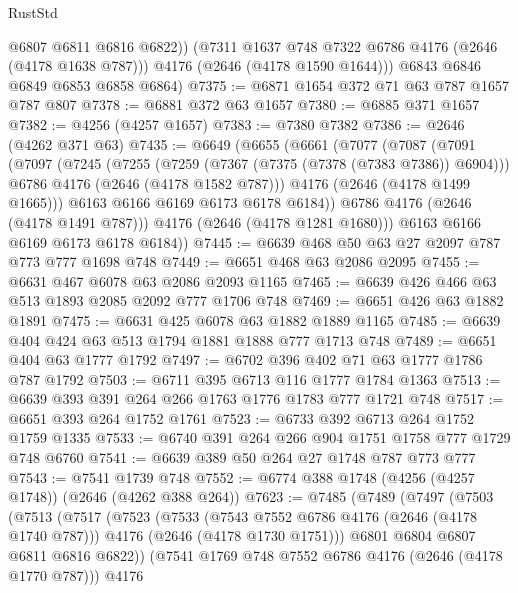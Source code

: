 \begin{lexlean}{RustStd}
\begin{coremodule}
            @6807
            @6811
            @6816
            @6822))
        (@7311 @1637 @748 @7322 @6786 @4176 (@2646 (@4178 @1638 @787)))
        @4176
        (@2646 (@4178 @1590 @1644)))
      @6843
      @6846
      @6849
      @6853
      @6858
      @6864)
@7375 := @6871 @1654 @372 @71 @63 @787 @1657 @787 @807
@7378 := @6881 @372 @63 @1657
@7380 := @6885 @371 @1657
@7382 := @4256 (@4257 @1657)
@7383 := @7380 @7382
@7386 := @2646 (@4262 @371 @63)
@7435 := @6649
    (@6655
      (@6661
        (@7077
          (@7087
            (@7091
              (@7097
                (@7245
                  (@7255
                    (@7259 (@7367 (@7375 (@7378 (@7383 @7386)) @6904)))
                    @6786
                    @4176
                    (@2646 (@4178 @1582 @787)))
                  @4176
                  (@2646 (@4178 @1499 @1665)))
                @6163
                @6166
                @6169
                @6173
                @6178
                @6184))
            @6786
            @4176
            (@2646 (@4178 @1491 @787)))
          @4176
          (@2646 (@4178 @1281 @1680)))
        @6163
        @6166
        @6169
        @6173
        @6178
        @6184))
@7445 := @6639 @468 @50 @63 @27 @2097 @787 @773 @777 @1698 @748
@7449 := @6651 @468 @63 @2086 @2095
@7455 := @6631 @467 @6078 @63 @2086 @2093 @1165
@7465 := @6639 @426 @466 @63 @513 @1893 @2085 @2092 @777 @1706 @748
@7469 := @6651 @426 @63 @1882 @1891
@7475 := @6631 @425 @6078 @63 @1882 @1889 @1165
@7485 := @6639 @404 @424 @63 @513 @1794 @1881 @1888 @777 @1713 @748
@7489 := @6651 @404 @63 @1777 @1792
@7497 := @6702 @396 @402 @71 @63 @1777 @1786 @787 @1792
@7503 := @6711 @395 @6713 @116 @1777 @1784 @1363
@7513 := @6639 @393 @391 @264 @266 @1763 @1776 @1783 @777 @1721 @748
@7517 := @6651 @393 @264 @1752 @1761
@7523 := @6733 @392 @6713 @264 @1752 @1759 @1335
@7533 := @6740 @391 @264 @266 @904 @1751 @1758 @777 @1729 @748 @6760
@7541 := @6639 @389 @50 @264 @27 @1748 @787 @773 @777
@7543 := @7541 @1739 @748
@7552 := @6774 @388 @1748 (@4256 (@4257 @1748)) (@2646 (@4262 @388 @264))
@7623 := @7485
    (@7489
      (@7497
        (@7503
          (@7513
            (@7517
              (@7523
                (@7533
                  (@7543 @7552 @6786 @4176 (@2646 (@4178 @1740 @787)))
                  @4176
                  (@2646 (@4178 @1730 @1751)))
                @6801
                @6804
                @6807
                @6811
                @6816
                @6822))
            (@7541 @1769 @748 @7552 @6786 @4176 (@2646 (@4178 @1770 @787)))
            @4176

\end{coremodule}
\end{lexlean}
